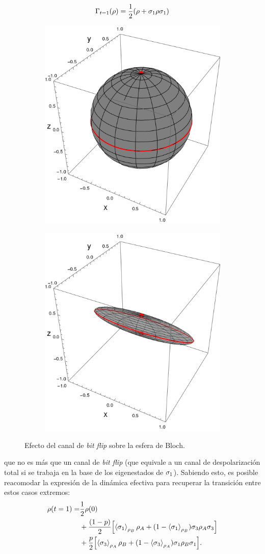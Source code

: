 \begin{equation*}
  \Gamma_{t=1}(\rho)=\frac{1}{2}\qty(\rho+\sigma_{1}\rho\sigma_{1})
\end{equation*}
\begin{figure}[ht!]
  \centering
  \begin{subfigure}{0.5\textwidth}
    \centering
    \includegraphics[width=0.6\linewidth]{chapter3/figures_toy/sphere_swapcontraction_t=0.0_z=0.9_p=0.9.png}
  \end{subfigure}%
  \begin{subfigure}{0.5\textwidth}
    \centering
    \includegraphics[width=0.6\linewidth]{chapter3/figures_toy/sphere_BitF_t=1.0_z=0.8_p=0.6.png}
  \end{subfigure}
  \caption{Efecto del canal de \textit{bit flip} sobre la esfera de Bloch.}\label{fig:BitFlip}
\end{figure}
que no es más que un canal de \textit{bit flip} (que equivale a un canal de despolarización total si se trabaja en la base de los eigenestados de $\sigma_{1}$). Sabiendo esto, es posible reacomodar la expresión de la dinámica efectiva para recuperar la transición entre estos casos extremos:
\begin{align*}
  \rho(t=1)=&\frac{1}{2}\rho(0)\\
  &+\frac{(1-p)}{2}\qty[\expval{\sigma_{1}}_{\rho_{B}}\rho_{A}+(1-\expval{\sigma_{1}}_{\rho_{B}})\sigma_{3}\rho_{A}\sigma_{3}]\\
  &+\frac{p}{2}\qty[\expval{\sigma_{3}}_{\rho_{A}}\rho_{B}+(1-\expval{\sigma_{3}}_{\rho_{A}})\sigma_{1}\rho_{B}\sigma_{1}].
\end{align*}

